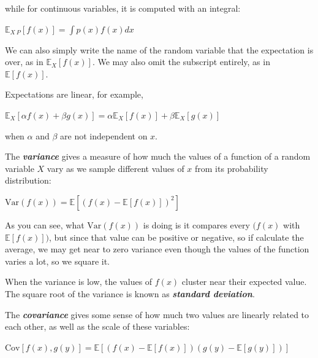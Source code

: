 \documentclass{report}
\begin{document}
\noindent while for continuous variables, it is computed with an integral:\newline\newline
\centerline{$\mathbb{E}_{X~P}[f(x)] = \int p(x)f(x)dx$}\newline

\noindent We can also simply write the name of the random variable that the expectation is over, as in $\mathbb{E}_X[f(x)]$. We may also omit the subscript entirely, as in $\mathbb{E}[f(x)]$.\newline

\noindent Expectations are linear, for example,\newline\newline
\centerline{$\mathbb{E}_X[\alpha f(x) + \beta g(x)] = \alpha \mathbb{E}_X[f(x)] + \beta \mathbb{E}_X[g(x)]$}\newline
when $\alpha$ and $\beta$ are not independent on $x$.\newline

\noindent The \textbf{\textit{variance}} gives a measure of how much the values of a function of a random variable $X$ vary as we sample different values of $x$ from its probability distribution:\newline\newline
\centerline{$\text{Var}(f(x)) = \mathbb{E}[(f(x) - \mathbb{E}[f(x)])^2]$}

\noindent As you can see, what $\text{Var}(f(x))$ is doing is it compares every $(f(x)$ with $\mathbb{E}[f(x)])$, but since that value can be positive or negative, so if calculate the average, we may get near to zero variance even though the values of the function varies a lot, so we square it.\newline

\noindent When the variance is low, the values of $f(x)$ cluster near their expected value. The square root of the variance is known as \textbf{\textit{standard deviation}}.\newline

\noindent The \textbf{\textit{covariance}} gives some sense of how much two values are linearly related to each other, as well as the scale of these variables:\newline\newline
\centerline{$\text{Cov}[f(x),g(y)]=\mathbb{E}[(f(x)-\mathbb{E}[f(x)])(g(y)-\mathbb{E}[g(y)])]$}\newline
\end{document}
